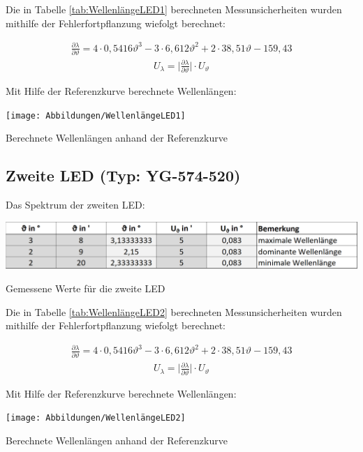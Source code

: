 \documentclass[a4paper]{scrartcl}
\numberwithin{equation}{subsection}
\begin{document}
Die in Tabelle \ref{tab:WellenlängeLED1} berechneten Messunsicherheiten wurden mithilfe der Fehlerfortpflanzung wiefolgt berechnet:

\begin{align*}
	\frac{\partial\lambda}{\partial\vartheta} = 4 \cdot 0,5416\vartheta^3 - 3 \cdot 6,612\vartheta^2 + 2 \cdot 38,51\vartheta -159,43
\end{align*}
\begin{align*}
	U_\lambda = \bigg | \frac{\partial\lambda}{\partial\vartheta} \bigg | \cdot U_\vartheta
\end{align*}

Mit Hilfe der Referenzkurve berechnete Wellenlängen:

\begin{table}[H]
	\texttt{[image: Abbildungen/WellenlängeLED1]}
	\centering
	\caption{Berechnete Wellenlängen anhand der Referenzkurve}
	\centering
	\label{tab:WellenlängeLED1}
\end{table}

\subsection{Zweite LED (Typ: YG-574-520)}
Das Spektrum der zweiten LED:

\begin{table}[H]
	\includegraphics[width=14cm]{Abbildungen/MesswerteLED2}
	\centering
	\caption{Gemessene Werte für die zweite LED}
	\centering
	\label{tab:MesswerteLED2}
\end{table}
\newpage
Die in Tabelle \ref{tab:WellenlängeLED2} berechneten Messunsicherheiten wurden mithilfe der Fehlerfortpflanzung wiefolgt berechnet:

\begin{align*}
	\frac{\partial\lambda}{\partial\vartheta} = 4 \cdot 0,5416\vartheta^3 - 3 \cdot 6,612\vartheta^2 + 2 \cdot 38,51\vartheta -159,43
\end{align*}
\begin{align*}
	U_\lambda = \bigg | \frac{\partial\lambda}{\partial\vartheta} \bigg | \cdot U_\vartheta
\end{align*}

Mit Hilfe der Referenzkurve berechnete Wellenlängen:

\begin{table}[H]
	\texttt{[image: Abbildungen/WellenlängeLED2]}
	\centering
	\caption{Berechnete Wellenlängen anhand der Referenzkurve}
	\centering
	\label{tab:WellenlängeLED2}
\end{table}
\end{document}

